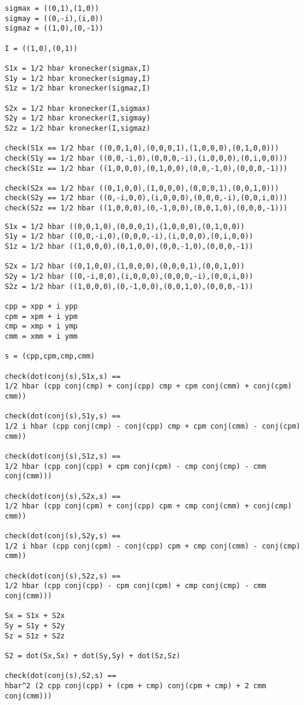 {\footnotesize\begin{verbatim}
sigmax = ((0,1),(1,0))
sigmay = ((0,-i),(i,0))
sigmaz = ((1,0),(0,-1))

I = ((1,0),(0,1))

S1x = 1/2 hbar kronecker(sigmax,I)
S1y = 1/2 hbar kronecker(sigmay,I)
S1z = 1/2 hbar kronecker(sigmaz,I)

S2x = 1/2 hbar kronecker(I,sigmax)
S2y = 1/2 hbar kronecker(I,sigmay)
S2z = 1/2 hbar kronecker(I,sigmaz)

check(S1x == 1/2 hbar ((0,0,1,0),(0,0,0,1),(1,0,0,0),(0,1,0,0)))
check(S1y == 1/2 hbar ((0,0,-i,0),(0,0,0,-i),(i,0,0,0),(0,i,0,0)))
check(S1z == 1/2 hbar ((1,0,0,0),(0,1,0,0),(0,0,-1,0),(0,0,0,-1)))

check(S2x == 1/2 hbar ((0,1,0,0),(1,0,0,0),(0,0,0,1),(0,0,1,0)))
check(S2y == 1/2 hbar ((0,-i,0,0),(i,0,0,0),(0,0,0,-i),(0,0,i,0)))
check(S2z == 1/2 hbar ((1,0,0,0),(0,-1,0,0),(0,0,1,0),(0,0,0,-1)))
\end{verbatim}}

\newpage
{}

{\footnotesize\begin{verbatim}
S1x = 1/2 hbar ((0,0,1,0),(0,0,0,1),(1,0,0,0),(0,1,0,0))
S1y = 1/2 hbar ((0,0,-i,0),(0,0,0,-i),(i,0,0,0),(0,i,0,0))
S1z = 1/2 hbar ((1,0,0,0),(0,1,0,0),(0,0,-1,0),(0,0,0,-1))

S2x = 1/2 hbar ((0,1,0,0),(1,0,0,0),(0,0,0,1),(0,0,1,0))
S2y = 1/2 hbar ((0,-i,0,0),(i,0,0,0),(0,0,0,-i),(0,0,i,0))
S2z = 1/2 hbar ((1,0,0,0),(0,-1,0,0),(0,0,1,0),(0,0,0,-1))

cpp = xpp + i ypp
cpm = xpm + i ypm
cmp = xmp + i ymp
cmm = xmm + i ymm

s = (cpp,cpm,cmp,cmm)

check(dot(conj(s),S1x,s) ==
1/2 hbar (cpp conj(cmp) + conj(cpp) cmp + cpm conj(cmm) + conj(cpm) cmm))

check(dot(conj(s),S1y,s) ==
1/2 i hbar (cpp conj(cmp) - conj(cpp) cmp + cpm conj(cmm) - conj(cpm) cmm))

check(dot(conj(s),S1z,s) ==
1/2 hbar (cpp conj(cpp) + cpm conj(cpm) - cmp conj(cmp) - cmm conj(cmm)))

check(dot(conj(s),S2x,s) ==
1/2 hbar (cpp conj(cpm) + conj(cpp) cpm + cmp conj(cmm) + conj(cmp) cmm))

check(dot(conj(s),S2y,s) ==
1/2 i hbar (cpp conj(cpm) - conj(cpp) cpm + cmp conj(cmm) - conj(cmp) cmm))

check(dot(conj(s),S2z,s) ==
1/2 hbar (cpp conj(cpp) - cpm conj(cpm) + cmp conj(cmp) - cmm conj(cmm)))

Sx = S1x + S2x
Sy = S1y + S2y
Sz = S1z + S2z

S2 = dot(Sx,Sx) + dot(Sy,Sy) + dot(Sz,Sz)

check(dot(conj(s),S2,s) ==
hbar^2 (2 cpp conj(cpp) + (cpm + cmp) conj(cpm + cmp) + 2 cmm conj(cmm)))
\end{verbatim}}


